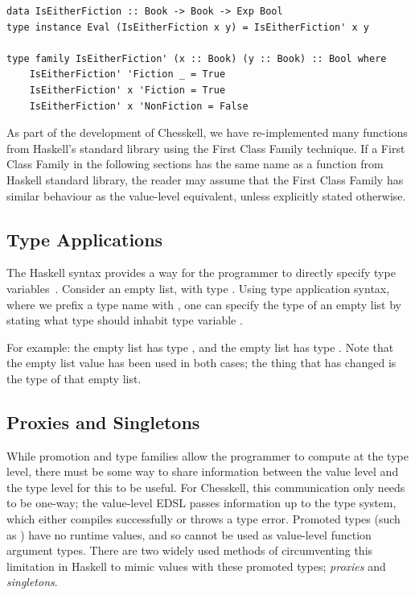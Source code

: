 \begin{lstlisting}
data IsEitherFiction :: Book -> Book -> Exp Bool
type instance Eval (IsEitherFiction x y) = IsEitherFiction' x y

type family IsEitherFiction' (x :: Book) (y :: Book) :: Bool where
    IsEitherFiction' 'Fiction _ = True
    IsEitherFiction' x 'Fiction = True
    IsEitherFiction' x 'NonFiction = False
\end{lstlisting}

As part of the development of Chesskell, we have re-implemented many functions from Haskell's standard library using the First Class Family technique. If a First Class Family in the following sections has the same name as a function from Haskell standard library, the reader may assume that the First Class Family has similar behaviour as the value-level equivalent, unless explicitly stated otherwise.

\subsection{Type Applications}

The  Haskell syntax provides a way for the programmer to directly specify type variables~\cite{typeapplication}. Consider an empty list, with type \inline{[a]}. Using type application syntax, where we prefix a type name with , one can specify the type of an empty list by stating what type should inhabit type variable .

For example: the empty list  has type \inline{[Int]}, and the empty list  has type \inline{[Bool]}. Note that the empty list value has been used in both cases; the thing that has changed is the type of that empty list.

\subsection{Proxies and Singletons}

While promotion and type families allow the programmer to compute at the type level, there must be some way to share information between the value level and the type level for this to be useful. For Chesskell, this communication only needs to be one-way; the value-level EDSL passes information up to the type system, which either compiles successfully or throws a type error. Promoted types (such as ) have no runtime values, and so cannot be used as value-level function argument types. There are two widely used methods of circumventing this limitation in Haskell to mimic values with these promoted types; \emph{proxies} and \emph{singletons}.

